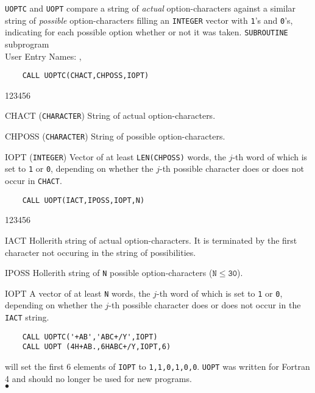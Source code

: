                       
            
\Submitter{}                          
 
{\tt UOPTC} and {\tt UOPT}
compare a string of {\it actual} option-characters against
a similar string of {\it possible} option-characters
filling an {\tt INTEGER} vector with {\tt 1}'s and {\tt 0}'s,
indicating for each possible option whether or not it was taken.
\Structure
{\tt SUBROUTINE} subprogram \\
User Entry Names: , \\
\Usage
\begin{verbatim}
    CALL UOPTC(CHACT,CHPOSS,IOPT)
\end{verbatim}
\begin{DLtt}{123456}
\item [CHACT] ({\tt CHARACTER}) String of actual option-characters.
\item [CHPOSS] ({\tt CHARACTER}) String of possible option-characters.
\item [IOPT] ({\tt INTEGER}) Vector of at least {\tt LEN(CHPOSS)} words,
the $j$-th word of which is set to {\tt 1} or {\tt 0},
depending on whether the $j$-th possible character does or does not
occur in {\tt CHACT}.
\end{DLtt}
\begin{verbatim}
    CALL UOPT(IACT,IPOSS,IOPT,N)
\end{verbatim}
\begin{DLtt}{123456}
\item [IACT] Hollerith string of actual option-characters.
It is terminated by the first character not occuring
in the string of possibilities.
\item [IPOSS] Hollerith string of {\tt N} possible option-characters
($\mathtt{N \leq 30}$).
\item [IOPT] A vector of at least {\tt N} words,
the $j$-th word of which is set to {\tt 1} or {\tt 0},
depending on whether the $j$-th possible character
does or does not occur in the {\tt IACT} string.
\end{DLtt}
\Examples
\begin{verbatim}
    CALL UOPTC('+AB','ABC+/Y',IOPT)
    CALL UOPT (4H+AB.,6HABC+/Y,IOPT,6)
\end{verbatim}
will set the first 6 elements of {\tt IOPT} to {\tt 1,1,0,1,0,0}.
\Notes
{\tt UOPT} was written for Fortran 4 and should no longer
be used for new programs.
\\ $\bullet$
